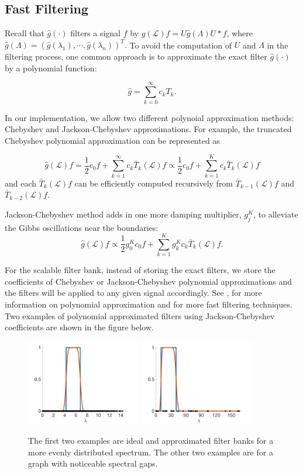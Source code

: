 \documentclass[a4paper]{article}
\newcommand{\La}{\mathcal{L}}
\theoremstyle{definition}
\begin{document}
\subsection{Fast Filtering}

Recall that $\hat{g}(\cdot)$ filters a signal $f$ by $\hat{g}(\La) f = U\hat{g}(\Lambda)U*f$, where $\hat{g}(\Lambda) = (\hat{g}(\lambda_1), \cdots, \hat{g}(\lambda_n))^T.$  To avoid the computation of $U$ and $\Lambda$ in the filtering process, one common approach is to approximate the exact filter $\hat{g}(\cdot)$ by a polynomial function:

$$\hat{g} = \sum_{k = 0}^{\infty} c_kT_k.$$

In our implementation, we allow two different polynoial approximation methods: Chebyshev and Jackson-Chebyshev approximations. For example, the truncated Chebyshev polynomial approximation can be represented as 

$$\hat{g}(\La)f = \frac{1}{2}c_0f + \sum_{k=1}^{\infty} c_k \bar{T}_k(\La)f \propto \frac{1}{2}c_0f + \sum_{k=1}^{K} c_k \bar{T}_k(\La)f$$ and each $\bar{T}_k(\La)f$ can be efficiently computed recursively from $\bar{T}_{k-1}(\La)f$ and $\bar{T}_{k-2}(\La)f$. 

Jackson-Chebyshev method adds in one more damping multiplier, $g_j^K$, to alleviate the Gibbs oscillations near the boundaries:
$$\hat{g}(\La)f \propto \frac{1}{2}g_0^Kc_0f + \sum_{k=1}^{K} g_k^Kc_k \bar{T}_k(\La)f.$$

For the scalable filter bank, instead of storing the exact filters, we store the coefficients of Chebyshev or Jackson-Chebyshev polynomial approximations and the filters will be applied to any given signal accordingly. See \cite{shuman2013spectrum}, \cite{Druskin and Knizhnerman} for more information on polynomial approximation and \cite{fast filtering} for more fast filtering techniques. Two examples of polynomial approximated filters using Jackson-Chebyshev coefficients are shown in the figure below.
 
 \begin{figure}[h]
 \centering
 \includegraphics[width = 5cm]{approx filter sensor.pdf}
 \includegraphics[width = 5cm]{approx filter net25.pdf}
 
 \caption{The first two examples are ideal and approximated filter banks for a more evenly distributed spectrum. The other two examples are for a graph with noticeable spectral gaps.}
 \end{figure}
\end{document}

